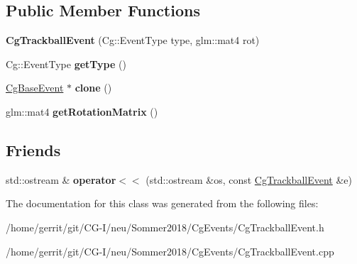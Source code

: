 \subsection*{Public Member Functions}
\begin{DoxyCompactItemize}
\item 
\mbox{\label{class_cg_trackball_event_a9ad70261e678ac14c023e1819316746e}} 
{\bfseries Cg\+Trackball\+Event} (Cg\+::\+Event\+Type type, glm\+::mat4 rot)
\item 
\mbox{\label{class_cg_trackball_event_ab3f81422524ca10731eb212a9acead85}} 
Cg\+::\+Event\+Type {\bfseries get\+Type} ()
\item 
\mbox{\label{class_cg_trackball_event_a115846e9dc04ef4e45f7f9cf9f6d7aab}} 
\hyperlink{class_cg_base_event}{Cg\+Base\+Event} $\ast$ {\bfseries clone} ()
\item 
\mbox{\label{class_cg_trackball_event_a463c43be5fbdfe60c3f780dc7622c4a2}} 
glm\+::mat4 {\bfseries get\+Rotation\+Matrix} ()
\end{DoxyCompactItemize}
\subsection*{Friends}
\begin{DoxyCompactItemize}
\item 
\mbox{\label{class_cg_trackball_event_a5b13cbe8129a5551e52fa2faa8917403}} 
std\+::ostream \& {\bfseries operator$<$$<$} (std\+::ostream \&os, const \hyperlink{class_cg_trackball_event}{Cg\+Trackball\+Event} \&e)
\end{DoxyCompactItemize}


The documentation for this class was generated from the following files\+:\begin{DoxyCompactItemize}
\item 
/home/gerrit/git/\+C\+G-\/\+I/neu/\+Sommer2018/\+Cg\+Events/Cg\+Trackball\+Event.\+h\item 
/home/gerrit/git/\+C\+G-\/\+I/neu/\+Sommer2018/\+Cg\+Events/Cg\+Trackball\+Event.\+cpp\end{DoxyCompactItemize}
